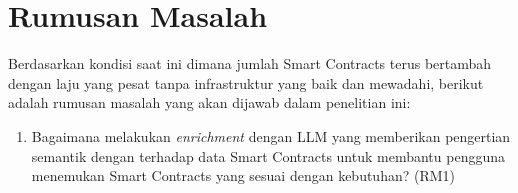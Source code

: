 \section{Rumusan Masalah}
\label{sec:rumusan-masalah}

Berdasarkan kondisi saat ini dimana jumlah Smart Contracts terus bertambah dengan laju yang pesat tanpa infrastruktur yang baik dan mewadahi, berikut adalah rumusan masalah yang akan dijawab dalam penelitian ini:
\begin{enumerate}
  


  \item Bagaimana melakukan \textit{enrichment} dengan LLM yang memberikan pengertian semantik dengan terhadap data Smart Contracts untuk membantu pengguna menemukan Smart Contracts yang sesuai dengan kebutuhan? (RM1)


\end{enumerate}

